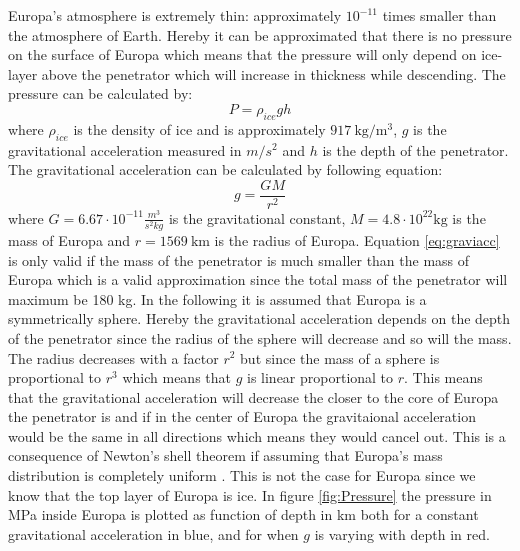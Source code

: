  \label{sec:Pressure}
Europa's atmosphere is extremely thin: approximately $10^{-11}$ times smaller than the atmosphere of Earth\cite{hall1995a}. Hereby it can be approximated that there is no pressure on the surface of Europa which means that the pressure will only depend on ice-layer above the penetrator which will increase in thickness while descending. The pressure can be calculated by: 
\begin{equation}
P = \rho_{ice} g h
\end{equation}
where $\rho_{ice}$ is the density of ice and is approximately $\SI{917}{\kilo\gram\per\cubic\metre}$\cite{cutnell2007a}, $g$ is the gravitational acceleration measured in $m/s^2$ and $h$ is the depth of the penetrator. The gravitational acceleration can be calculated by following equation:
\begin{equation}\label{eq:graviacc}
g = \frac{GM}{r^2}
\end{equation} 
where $G = 6.67\cdot 10^{-11}\frac{m^3}{s^2 kg}$ is the gravitational constant, $M = 4.8\cdot 10^{22}\text{kg}$ is the mass of Europa and $r = \SI{1569}{\km}$ is the radius of Europa\cite{website:propeuropa}. Equation \ref{eq:graviacc} is only valid if the mass of the penetrator is much smaller than the mass of Europa which is a valid approximation since the total mass of the penetrator will maximum be 180 kg. In the following it is assumed that Europa is a symmetrically sphere. Hereby the gravitational acceleration depends on the depth of the penetrator since the radius of the sphere will decrease and so will the mass. The radius decreases with a factor $r^2$ but since the mass of a sphere is proportional to $r^3$ which means that $g$ is linear proportional to $r$. This means that the gravitational acceleration will decrease the closer to the core of Europa the penetrator is and if in the center of Europa the gravitaional acceleration would be the same in all directions which means they would cancel out. This is a consequence of Newton's shell theorem if assuming that Europa's mass distribution is completely uniform \cite{website:shelltheorem}. This is not the case for Europa since we know that the top layer of Europa is ice. In figure \ref{fig:Pressure} the pressure in MPa inside Europa is plotted as function of depth in km both for a constant gravitational acceleration in blue, and for when $g$ is varying with depth in red.  
